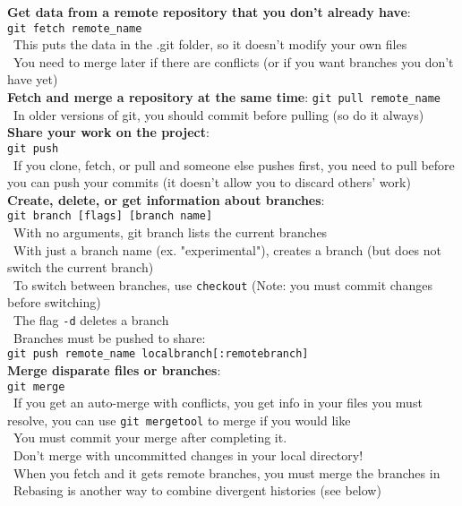 \documentclass[12pt]{article}
\begin{document}
{{\bf Get data from a remote repository that you don't already have}:\\
\texttt{git fetch remote{\_}name}\\
\textbullet\, This puts the data in the .git folder, so it doesn't modify your own files\\
\textbullet\, You need to merge later if there are conflicts (or if you want branches you don't have yet)\\
    
{\bf Fetch and merge a repository at the same time}:
\texttt{git pull remote{\_}name}\\
\textbullet\, In older versions of git, you should commit before pulling (so do it always)\\

{\bf Share your work on the project}:\\
\texttt{git push}\\
\textbullet\, If you clone, fetch, or pull and someone else pushes first, you need to pull before you can push your commits (it doesn't allow you to discard others' work)\\

{\bf Create, delete, or get information about branches}:\\
\texttt{git branch [flags] [branch name]}\\
\textbullet\, With no arguments, git branch lists the current branches\\
\textbullet\, With just a branch name (ex. "experimental"), creates a branch (but does not switch the current branch)\\
\textbullet\, To switch between branches, use \texttt{checkout} (Note: you must commit changes before switching)\\
\textbullet\, The flag \texttt{-d} deletes a branch\\
\textbullet\, Branches must be pushed to share:\\
 \hspace*{6mm}\texttt{git push remote{\_}name localbranch[:remotebranch]}\\

{\bf Merge disparate files or branches}:\\
\texttt{git merge}\\    
\textbullet\, If you get an auto-merge with conflicts, you get info in your files you must resolve, you can use \texttt{git mergetool} to merge if you would like\\
\textbullet\, You must commit your merge after completing it.\\
\textbullet\, Don't merge with uncommitted changes in your local directory!\\
\textbullet\, When you fetch and it gets remote branches, you must merge the branches in\\
\textbullet\, Rebasing is another way to combine divergent histories (see below)\\

}
\end{document}
